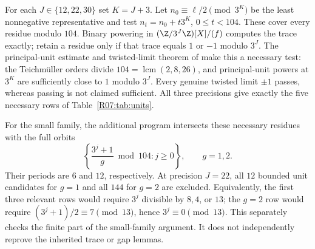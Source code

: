 \documentclass[11pt,a4paper]{article}
\theoremstyle{definition}\newtheorem{definition}[theorem]{Definition}
\theoremstyle{remark}\newtheorem{remark}[theorem]{Remark}
\begin{document}
For each $J\in\{12,22,30\}$ set $K=J+3$. Let
$n_0\equiv\ell/2\pmod{3^K}$ be the least nonnegative representative
and test $n_t=n_0+t3^K$, $0\le t<104$.
These cover every residue modulo $104$.
Binary powering in $(\Z/3^J\Z)[X]/(f)$ computes the trace exactly;
retain a residue only if that trace equals $1$ or $-1$ modulo $3^J$.
The principal-unit estimate and twisted-limit theorem of \cite{K064}
make this a necessary test: the Teichm\"uller orders divide
$104=\operatorname{lcm}(2,8,26)$, and principal-unit powers at $3^K$
are sufficiently close to $1$ modulo $3^J$.
Every genuine twisted limit $\pm1$ passes, whereas passing is not
claimed sufficient. All three precisions give exactly the five necessary
rows of Table~\ref{R07:tab:units}.

For the small family, the additional program intersects these necessary
residues with the full orbits
\[
                  \left\{\frac{3^j+1}{g}\bmod104:j\ge0\right\},
                  \qquad g=1,2.
\]
Their periods are $6$ and $12$, respectively. At precision $J=22$,
all $12$ bounded unit candidates for $g=1$ and all $144$ for $g=2$
are excluded. Equivalently, the first three relevant rows would require
$3^j$ divisible by $8,4$, or $13$; the $g=2$ row would require
$(3^j+1)/2\equiv7\pmod{13}$, hence $3^j\equiv0\pmod{13}$.
This separately checks the finite part of the small-family argument.
It does not independently reprove the inherited trace or gap lemmas.
\end{document}
